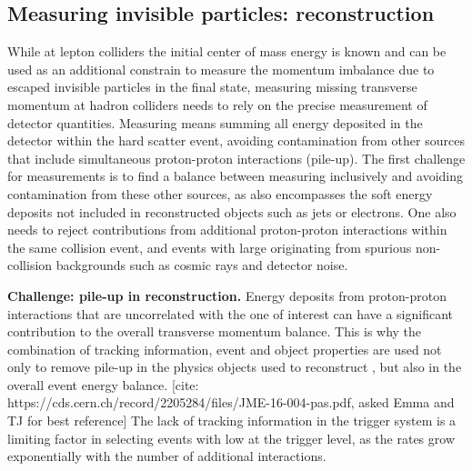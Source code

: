 \begin{textbox}[!h]
\section{Measuring invisible particles: \MET reconstruction}

While at lepton colliders the initial center of mass energy is known and 
can be used as an additional constrain to measure the momentum imbalance due to escaped invisible particles in the final state, measuring missing transverse momentum at hadron colliders
needs to rely on the precise measurement of detector quantities. Measuring \MET means summing all energy deposited in the detector within the hard scatter event, avoiding contamination from other sources that include simultaneous proton-proton interactions (pile-up). The first challenge for \MET measurements is to find a balance between measuring inclusively and avoiding contamination from these other sources, as \MET also encompasses the soft energy deposits not included in reconstructed objects such as jets or electrons. 
One also needs to reject \MET contributions from additional proton-proton interactions within the same collision event, and events with large \MET originating from spurious non-collision backgrounds such as cosmic rays and detector noise. 

\textbf{Challenge: pile-up in \MET reconstruction.} 
Energy deposits from proton-proton interactions that are uncorrelated 
with the one of interest can have a significant contribution to the overall 
transverse momentum balance. This is why the combination of tracking information, 
event and object properties are used not only to remove
pile-up in the physics objects used to reconstruct \MET, but also in 
the overall event energy balance. [cite: https://cds.cern.ch/record/2205284/files/JME-16-004-pas.pdf, 
asked Emma and TJ for best reference]
The lack of tracking information in the trigger system is a limiting factor 
in selecting events with low \MET at the trigger level,
as the rates grow exponentially with the number of additional interactions. 


\end{textbox}
